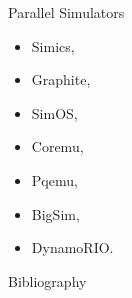 \begin{frame}{Parallel Simulators}
  \begin{itemize}
    \item Simics,
    \item Graphite,
    \item SimOS,
    \item Coremu,
    \item Pqemu,
    \item BigSim,
    \item DynamoRIO.
  \end{itemize}
\end{frame}

\begin{frame}[allowframebreaks]{Bibliography}
  \nocite{gharachorloo-memory-consistency}
  \nocite{ding-pqemu}
  \nocite{fujimoto-pdes}
  \nocite{liu-pdes}
  \nocite{misra-ddes}
  \printbibliography
\end{frame}

\finalslide


